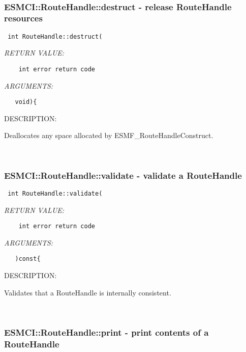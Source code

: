  
\mbox{}\hrulefill\ 
 
\subsubsection [ESMCI::RouteHandle::destruct] {ESMCI::RouteHandle::destruct - release RouteHandle resources}


  
\begin{verbatim} int RouteHandle::destruct(\end{verbatim}{\em RETURN VALUE:}
\begin{verbatim}    int error return code\end{verbatim}{\em ARGUMENTS:}
\begin{verbatim}   void){\end{verbatim}
{\sf DESCRIPTION:\\ }


    Deallocates any space allocated by ESMF_RouteHandleConstruct.
   
 
\mbox{}\hrulefill\ 
 
\subsubsection [ESMCI::RouteHandle::validate] {ESMCI::RouteHandle::validate - validate a RouteHandle}


  
\begin{verbatim} int RouteHandle::validate(\end{verbatim}{\em RETURN VALUE:}
\begin{verbatim}    int error return code\end{verbatim}{\em ARGUMENTS:}
\begin{verbatim}   )const{\end{verbatim}
{\sf DESCRIPTION:\\ }


    Validates that a RouteHandle is internally consistent.
   
 
\mbox{}\hrulefill\ 
 
\subsubsection [ESMCI::RouteHandle::print] {ESMCI::RouteHandle::print - print contents of a RouteHandle}


